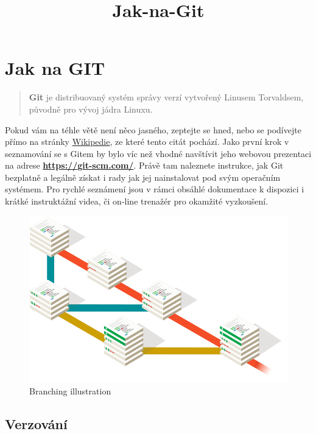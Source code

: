 \documentclass{report}
\title{Jak-na-Git}
\begin{document}
    
    
    
    

    
    \chapter*{Jak na GIT}\label{jak-na-git}

    \begin{quote}
\textbf{Git} je distribuovaný systém správy verzí vytvořený Linusem
Torvaldsem, původně pro vývoj jádra Linuxu.
\end{quote}

    Pokud vám na téhle větě není něco jasného, zeptejte se hned, nebo se
podívejte přímo na stránky
\href{https://cs.wikipedia.org/wiki/Git}{Wikipedie}, ze které tento
citát pochází. Jako první krok v seznamování se s Gitem by bylo víc než
vhodné navštívit jeho webovou prezentaci na adrese
\textbf{\url{https://git-scm.com/}}. Právě tam naleznete instrukce, jak
Git bezplatně a legálně získat i rady jak jej nainstalovat pod svým
operačním systémem. Pro rychlé seznámení jsou v rámci obsáhlé
dokumentace k dispozici i krátké instruktážní videa, či on-line trenažér
pro okamžité vyzkoušení.

    \begin{figure}[htbp]
\centering
\includegraphics[width=\linewidth]{../images/branching-illustration@2x.png}
\caption{Branching illustration}
\end{figure}

    \section*{Verzování}\label{verzovuxe1nuxed}
\end{document}
